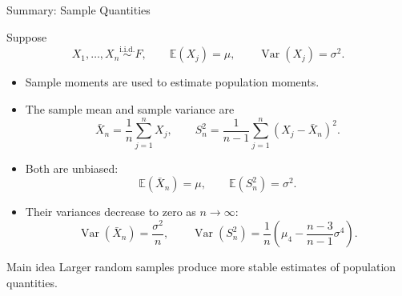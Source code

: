 \begin{frame}{Summary: Sample Quantities}

\small

Suppose
\[
X_1,\dots,X_n\overset{\text{i.i.d.}}{\sim}F,
\qquad
\mathbb{E}(X_j)=\mu,
\qquad
\operatorname{Var}(X_j)=\sigma^2.
\]

\begin{itemize}
    \item Sample moments are used to estimate population moments.

    \item The sample mean and sample variance are
    \[
    \bar X_n=\frac1n\sum_{j=1}^nX_j,
    \qquad
    S_n^2=\frac1{n-1}\sum_{j=1}^n(X_j-\bar X_n)^2.
    \]

    \item Both are unbiased:
    \[
    \mathbb{E}(\bar X_n)=\mu,
    \qquad
    \mathbb{E}(S_n^2)=\sigma^2.
    \]

    \item Their variances decrease to zero as \(n\to\infty\):
    \[
    \operatorname{Var}(\bar X_n)=\frac{\sigma^2}{n},
    \qquad
    \operatorname{Var}(S_n^2)
    =
    \frac1n\left(
    \mu_4-\frac{n-3}{n-1}\sigma^4
    \right).
    \]
\end{itemize}

\begin{keybox}{Main idea}
Larger random samples produce more stable estimates of population quantities.
\end{keybox}

\end{frame}
